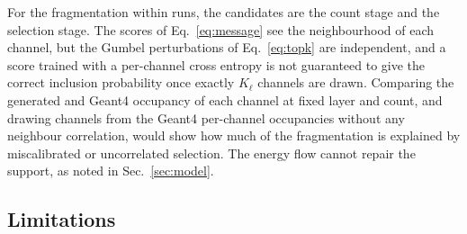 \documentclass[11pt]{article}
\begin{document}
For the fragmentation within runs, the candidates are the count stage and the selection stage. The scores of Eq.~\eqref{eq:message} see the neighbourhood of each channel, but the Gumbel perturbations of Eq.~\eqref{eq:topk} are independent, and a score trained with a per-channel cross entropy is not guaranteed to give the correct inclusion probability once exactly $K_\ell$ channels are drawn. Comparing the generated and Geant4 occupancy of each channel at fixed layer and count, and drawing channels from the Geant4 per-channel occupancies without any neighbour correlation, would show how much of the fragmentation is explained by miscalibrated or uncorrelated selection. The energy flow cannot repair the support, as noted in Sec.~\ref{sec:model}.

\subsection{Limitations}
\label{sec:limitations}
\end{document}
